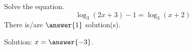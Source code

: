 \documentclass{ximera}
\author{Bobby Ramsey}
\begin{document}
\begin{exercise}
	Solve the equation.
	\[ \log_3(2x+3) - 1 = \log_3(x+2) \]
	There is/are $\answer{1}$ solution(s).
	\begin{exercise}
		Solution: $x = \answer{-3 }$.
	\end{exercise}
\end{exercise}
\end{document}
